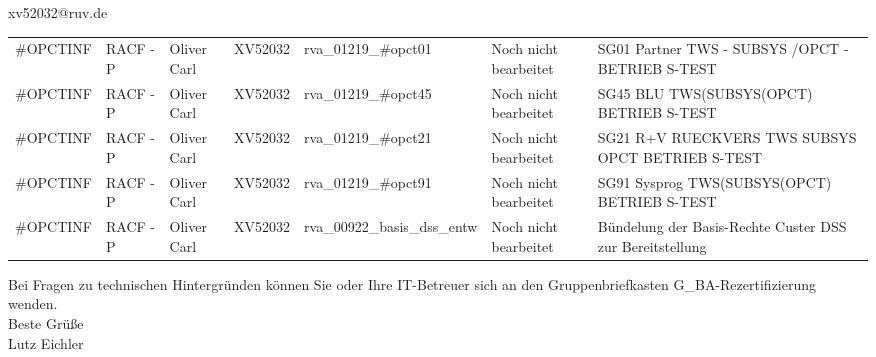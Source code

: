 \documentclass[a4paper,landscape,12pt]{letter}
\begin{document}
\begin{letter}{xv52032@ruv.de\hfill \break}
\begin{tiny}
\begin{longtable}{|p{35mm}|p{15mm}|p{25mm}|p{10mm}|p{40mm}|p{50mm}|p{50mm}|}
\#OPCTINF & RACF - P & Oliver Carl & XV52032 & rva\_01219\_\#opct01 & Noch nicht bearbeitet & SG01 Partner TWS - SUBSYS /OPCT - BETRIEB S-TEST \\
\#OPCTINF & RACF - P & Oliver Carl & XV52032 & rva\_01219\_\#opct45 & Noch nicht bearbeitet & SG45 BLU TWS(SUBSYS(OPCT) BETRIEB S-TEST \\
\#OPCTINF & RACF - P & Oliver Carl & XV52032 & rva\_01219\_\#opct21 & Noch nicht bearbeitet & SG21 R+V RUECKVERS TWS SUBSYS OPCT BETRIEB S-TEST \\
\#OPCTINF & RACF - P & Oliver Carl & XV52032 & rva\_01219\_\#opct91 & Noch nicht bearbeitet & SG91 Sysprog TWS(SUBSYS(OPCT) BETRIEB S-TEST \\
\#OPCTINF & RACF - P & Oliver Carl & XV52032 & rva\_00922\_basis\_dss\_entw & Noch nicht bearbeitet & Bündelung der Basis-Rechte Custer DSS zur Bereitstellung \\

\hline
		\end{longtable}
		\end{tiny}
	
\begin{minipage}{\textwidth}
			Bei Fragen zu technischen Hintergründen können Sie 
			oder Ihre IT-Betreuer sich an den Gruppenbriefkasten 
			G\_BA-Rezertifizierung
			wenden.\\
			\linebreak
			Beste Grüße\\
			Lutz Eichler
	\end{minipage}
	\end{letter}
	
\end{document}
